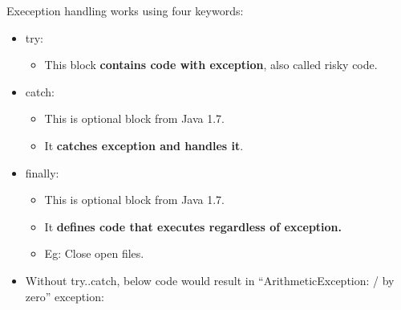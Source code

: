 \setlength{\columnsep}{3pt}
\begin{flushleft}

	Exeception handling works using four keywords:
	
	\begin{itemize}
		\item try: 
		\begin{itemize}
			\item This block \textbf{contains code with exception}, also called risky code.
		\end{itemize}
		
		\item catch: 
		\begin{itemize}
			\item This is optional block from Java 1.7.
			\item It \textbf{catches exception and handles it}. 
		\end{itemize}
		
		\item finally: 
		\begin{itemize}
			\item This is optional block from Java 1.7.
			\item It \textbf{defines code that executes regardless of exception.}
			\item Eg: Close open files.
		\end{itemize}
		\bigskip
		
		\newpage
		
		
		\item Without try..catch, below code would result in “ArithmeticException: / by zero” exception:
		

\end{itemize}
\end{flushleft}
